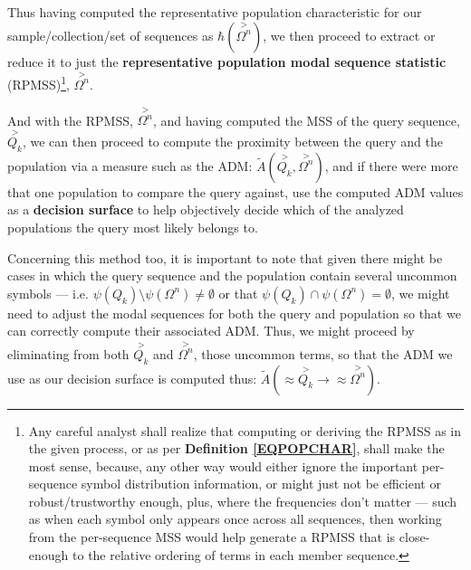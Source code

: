 \documentclass[a4paper, 18pt]{book} %
\begin{document}
Thus having computed the representative population characteristic for our sample/collection/set of sequences as $\hbar(\overset{>}{\Omega^n})$, we then proceed to extract or reduce it to just the \textbf{representative population modal sequence statistic} (RPMSS)\footnote{Any careful analyst shall realize that computing or deriving the RPMSS as in the given process, or as per \textbf{Definition \ref{EQPOPCHAR}}, shall make the most sense, because, any other way would either ignore the important per-sequence symbol distribution information, or might just not be efficient or robust/trustworthy enough, plus, where the frequencies don't matter --- such as when each symbol only appears once across all sequences, then working from the per-sequence MSS would help generate a RPMSS that is close-enough to the relative ordering of terms in each member sequence.}, $\overset{>}{\Omega^n}$.

And with the RPMSS, $\overset{>}{\Omega^n}$, and having computed the MSS of the query sequence, $\overset{>}{Q_k}$, we can then proceed to compute the proximity between the query and the population via a measure such as the ADM: $\tilde{A}(\overset{>}{Q_k},\overset{>}{\Omega^n})$, and if there were more that one population to compare the query against, use the computed ADM values as a \textbf{decision surface} to help objectively decide which of the analyzed populations the query most likely belongs to.

Concerning this method too, it is important to note that given there might be cases in which the query sequence and the population contain several uncommon symbols --- i.e. $\psi(Q_k) \setminus \psi(\Omega^n) \neq \emptyset$ or that $\psi(Q_k) \cap \psi(\Omega^n) = \emptyset$, we might need to adjust the modal sequences for both the query and population so that we can correctly compute their associated ADM. Thus, we might proceed by eliminating from both $\overset{>}{Q_k}$ and $\overset{>}{\Omega^n}$, those uncommon terms, so that the ADM we use as our decision surface is computed thus: $\tilde{A}(\approx\overset{>}{Q_k} \rightarrow \approx\overset{>}{\Omega^n})$.
\end{document}
